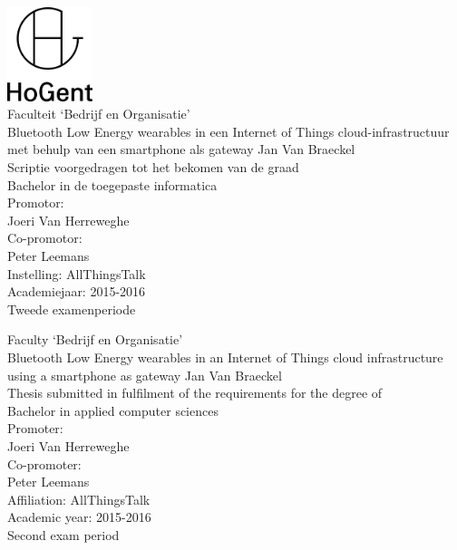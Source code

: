 \documentclass[pdftex,a4paper,12pt,twoside]{report}
\newcommand{\emptypage}{
\newpage
\thispagestyle{empty}
\mbox{}
\newpage
}
\newcommand{\student}{Jan {Van Braeckel}}
\newcommand{\promotor}{Joeri {Van Herreweghe}}
\newcommand{\copromotor}{Peter Leemans}
\newcommand{\instelling}{AllThingsTalk}
\newcommand{\titel}{Bluetooth Low Energy wearables in een Internet of Things cloud-infrastructuur met behulp van een smartphone als gateway}
\newcommand{\titleEN}{Bluetooth Low Energy wearables in an Internet of Things cloud infrastructure using a smartphone as gateway}
\newcommand{\faculteit}{Faculteit `Bedrijf en Organisatie'}
\newcommand{\faculty}{Faculty `Bedrijf en Organisatie'}
\newcommand{\rapporttype}{Scriptie voorgedragen tot het bekomen van de graad\\Bachelor in de toegepaste informatica}
\newcommand{\reporttype}{Thesis submitted in fulfilment of the requirements for the degree of\\Bachelor in applied computer sciences}
\newcommand{\academiejaar}{2015-2016}
\newcommand{\examenperiode}{Tweede examenperiode}
\newcommand{\examperiod}{Second exam period}
\begin{document}

\begin{titlepage}
  \begin{center}

    \begingroup
    \rmfamily
    \includegraphics[width=2.5cm]{img/HG-beeldmerk-woordmerk}\\[.5cm]
    \faculteit\\[3cm]
    \titel
    \vfill
    \student\\[3.5cm]
    \rapporttype\\[2cm]
    Promotor:\\
    \promotor\\
    Co-promotor:\\
    \copromotor\\[2.5cm]
    Instelling: \instelling\\[.5cm]
    Academiejaar: \academiejaar\\[.5cm]
    \examenperiode
    \endgroup

  \end{center}
  \restoregeometry
\end{titlepage}


\emptypage


\begin{titlepage}
  \begin{center}

    \begingroup
    \rmfamily
    \faculty\\[3cm]
    \titleEN
    \vfill
    \student\\[3.5cm]
    \reporttype\\[2cm]
    Promoter:\\
    \promotor\\
    Co-promoter:\\
    \copromotor\\[2.5cm]
    Affiliation: \instelling\\[.5cm]
    Academic year: \academiejaar\\[.5cm]
    \examperiod
    \endgroup

  \end{center}
  \restoregeometry
\end{titlepage}
\end{document}
